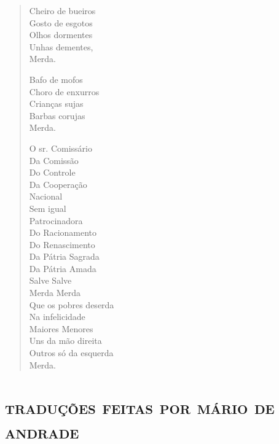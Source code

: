 
\begin{verse}
Cheiro de bueiros\\
Gosto de esgotos\\
Olhos dormentes\\
Unhas dementes,\\
Merda.

Bafo de mofos\\
Choro de enxurros\\
Crianças sujas\\
Barbas corujas\\
Merda.

O sr. Comissário\\
Da Comissão\\
Do Controle\\
Da Cooperação\\
Nacional\\
Sem igual\\
Patrocinadora\\
Do Racionamento\\
Do Renascimento\\
Da Pátria Sagrada\\
Da Pátria Amada\\
Salve Salve\\
Merda Merda\\
Que os pobres deserda\\
Na infelicidade\\
Maiores Menores\\
Uns da mão direita\\
Outros só da esquerda\\
Merda.
\end{verse}

\part{\textsc{traduções feitas por mário de andrade}}

